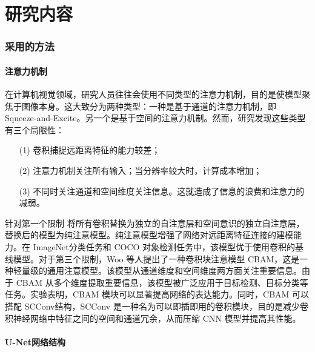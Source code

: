 \documentclass[a4paper]{ctexart}
\begin{document}
	\part*{研究内容}
	
	\section{采用的方法}

	\subsection{注意力机制}
	
	在计算机视觉领域，研究人员往往会使用不同类型的注意力机制，目的是使模型聚焦于图像本身。这大致分为两种类型：一种是基于通道的注意力机制，即 Squeeze-and-Excite。另一个是基于空间的注意力机制\cite{woo2018cbam}。然而，研究发现这些类型有三个局限性：
	
	\begin{itemize}
		\item[(1)] 
		卷积捕捉远距离特征的能力较差；
		
		\item[(2)]
		注意力机制关注所有输入；当分辨率较大时，计算成本增加；
		
		\item[(3)]
		不同时关注通道和空间维度关注信息。这就造成了信息的浪费和注意力的减弱。
	\end{itemize}	
	
	针对第一个限制 \cite{ramachandran2019stand} 将所有卷积替换为独立的自注意层和空间意识的独立自注意层，替换后的模型为纯注意模型。纯注意模型增强了网络对远距离特征连接的建模能力。在 ImageNet分类任务和 COCO 对象检测任务中，该模型优于使用卷积的基线模型。对于第三个限制，Woo 等人\cite{woo2018cbam}提出了一种卷积块注意模型 CBAM，这是一种轻量级的通用注意模型。该模型从通道维度和空间维度两方面关注重要信息。由于 CBAM 从多个维度提取重要信息，该模型被广泛应用于目标检测、目标分类等任务。实验表明，CBAM 模块可以显著提高网络的表达能力。同时，CBAM 可以搭配 SCConv\cite{li2023scconv}结构，SCConv 是一种名为可以即插即用的卷积模块，目的是减少卷积神经网络中特征之间的空间和通道冗余，从而压缩 CNN 模型并提高其性能。
	
	\subsection{U-Net网络结构}
	
\end{document}
